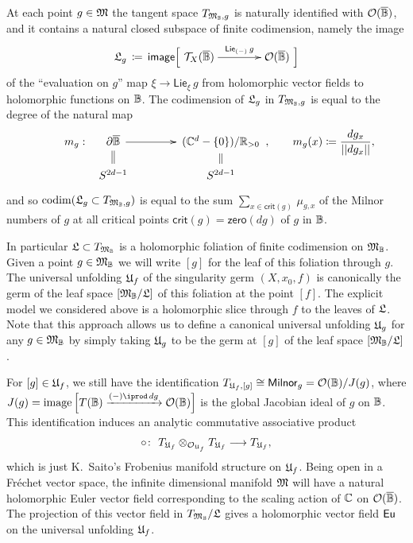 \documentclass[twoside,leqno]{article}
\numberwithin{equation}{section}
\theoremstyle{plain}
\theoremstyle{definition}
\begin{document}
At each point $g \in \mathfrak{M}$ the tangent space $T_{\mathfrak{M}_{\mathbb{B}},g}$ is naturally identified with $\mathcal O(\overline{\mathbb{B}})$, and it contains a natural closed subspace of finite codimension, namely
the image
\[
\folunivop_{g}  \, \coloneqq \, \mathsf{image} \Big[\xymatrix@1@C+1.2pc@M+0.2pc{\cT_{X}(\overline{\ball}) \ar[r]^-{\mathsf{Lie}_{(-)} \, g} & \cO(\overline{\ball})}\Big] 
\]
of the ``evaluation on $g$'' map $\xi \to \mathsf{Lie}_{\xi} \, g$ from holomorphic vector fields to holomorphic functions on $\mathbb{B}$. 
The codimension of $\mathfrak{L}_{g}$ in $T_{\mathfrak{M}_{\mathbb{B}},g}$ is equal to the
degree of the natural map 
\begin{equation} \label{eq:deg}
\xymatrix@R-1.2pc@C+1.2pc@M+0.2pc{
m_{g} \, \colon \, \hspace{-5pc} & \partial\overline{\ball} \ar@{=}[d] \ar[r] & (\bbC^{d}-\{0\})/\bbR_{>0} \ar@{=}[d]\\
& S^{2d-1} & S^{2d-1}
}, \qquad m_{g}(x) \coloneqq \frac{dg_{x}}{||dg_{x}||},
\end{equation}
and so $\operatorname{codim}(\mathfrak{L}_{g}\subset T_{\mathfrak{M}_{\mathbb{B}},g})$ is equal to the 
sum $\sum_{x \in \mathsf{crit}(g)} \, \mu_{g,x}$ of the Milnor numbers of $g$ at all critical points $\mathsf{crit}(g) = \mathsf{zero}(dg)$ of $g$ in $\mathbb{B}$. 

In particular $\mathfrak{L} \subset T_{\mathfrak{M}_{\mathbb{B}}}$ is a holomorphic foliation of finite codimension on $\mathfrak{M}_{\mathbb{B}}$. Given a point $g \in \mathfrak{M}_{\mathbb{B}}$ we will write  $[g]$ for the leaf of this foliation through $g$. The universal unfolding $\mathfrak{U}_{f}$ of the singularity germ $(X,x_{0},f)$ is canonically the germ of the leaf space $\left[\mathfrak{M}_{\mathbb{B}}/\mathfrak{L}\right]$ of this foliation at the point $[f]$. The explicit model we considered above is a holomorphic slice through $f$ to the leaves of $\mathfrak{L}$. Note that this approach allows us to define a canonical universal unfolding $\mathfrak{U}_{g}$ for any $g \in \mathfrak{M}_{\mathbb{B}}$ by simply taking $\mathfrak{U}_{g}$ to be the germ at $[g]$ of the leaf space $\left[\mathfrak{M}_{\mathbb{B}}/\mathfrak{L}\right]$.


For $[g] \in \mathfrak{U}_{f}$, we still have the identification $T_{\mathfrak{U}_{f},[g]} \cong \mathsf{Milnor}_{g} = \mathcal O(\mathbb{B})/J(g)$, where
$J(g) = \op{image}\Big[T(\ball) \xrightarrow{(-)\iprod \, dg} \cO(\ball)\Big]$
is the global Jacobian ideal of $g$ on $\mathbb{B}$. This identification induces an analytic 
commutative associative product  
\[
\fp \colon \ T_{\univ_{f}}\otimes_{\cO_{\univ_{f}}} T_{\univ_{f}} \longrightarrow T_{\univ_{f}},
\]
which is just K.~Saito's Frobenius manifold structure \cite{KyojiSaito-residue,KyojiSaito-primitive,MorihikoSaito-Brieskorn,Dubrovin_Geometry_of_2D,Sabbah-Isomonodromic} on $\mathfrak{U}_{f}$.  
Being open in a Fr\'{e}chet vector space, the infinite dimensional manifold $\mathfrak{M}$ will have a natural holomorphic Euler vector field corresponding to the scaling action of $\mathbb C$ on $\mathcal O(\overline{\mathbb{B}})$. The projection of this vector field in $T_{\mathfrak{M}_{\mathbb{B}}}/\mathfrak{L}$ gives a holomorphic vector field $\operatorname{\mathsf{Eu}}$ on the universal unfolding $\mathfrak{U}_{f}$.   
      
\end{document}
